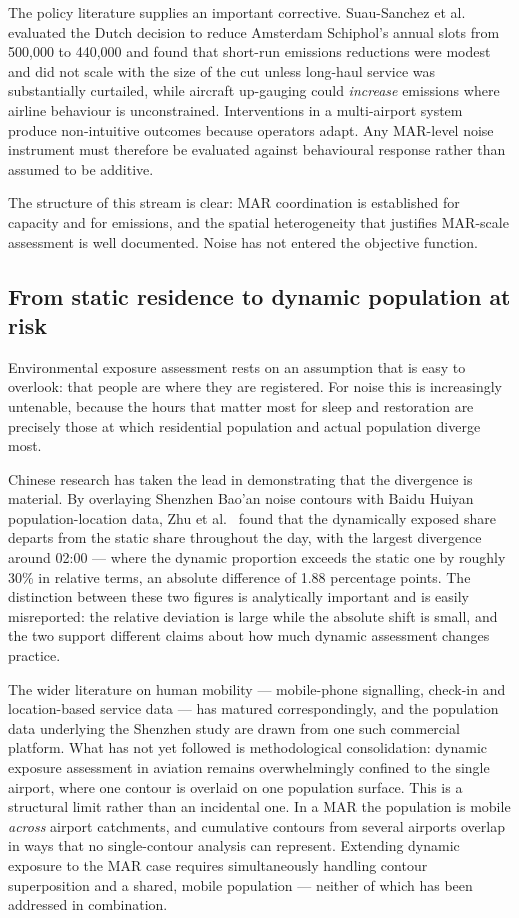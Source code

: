 \documentclass[review,12pt]{elsarticle}
\begin{document}
The policy literature supplies an important corrective. Suau-Sanchez et
al.~\cite{suau2025does} evaluated the Dutch decision to reduce Amsterdam
Schiphol's annual slots from 500,000 to 440,000 and found that short-run
emissions reductions were modest and did not scale with the size of the cut
unless long-haul service was substantially curtailed, while aircraft
up-gauging could \emph{increase} emissions where airline behaviour is
unconstrained. Interventions in a multi-airport system produce non-intuitive
outcomes because operators adapt. Any MAR-level noise instrument must therefore
be evaluated against behavioural response rather than assumed to be additive.

The structure of this stream is clear: MAR coordination is established for
capacity and for emissions, and the spatial heterogeneity that justifies
MAR-scale assessment is well documented. Noise has not entered the objective
function.

\subsection{From static residence to dynamic population at risk}
\label{sec:lr-dynamic}

Environmental exposure assessment rests on an assumption that is easy to
overlook: that people are where they are registered. For noise this is
increasingly untenable, because the hours that matter most for sleep and
restoration are precisely those at which residential population and actual
population diverge most.

Chinese research has taken the lead in demonstrating that the divergence is
material. By overlaying Shenzhen Bao'an noise contours with Baidu Huiyan
population-location data, Zhu et al.~\cite{zhu2025dynamic} found that the
dynamically exposed share departs from the static share throughout the day, with
the largest divergence around 02:00 --- where the dynamic proportion exceeds the
static one by roughly 30\% in relative terms, an absolute difference of 1.88
percentage points. The distinction between these two figures is analytically
important and is easily misreported: the relative deviation is large while the
absolute shift is small, and the two support different claims about how much
dynamic assessment changes practice.

The wider literature on human mobility --- mobile-phone signalling, check-in and
location-based service data --- has matured correspondingly, and the population
data underlying the Shenzhen study are drawn from one such commercial platform.
What has not yet followed is methodological consolidation: dynamic exposure
assessment in aviation remains overwhelmingly
confined to the single airport, where one contour is overlaid on one population
surface. This is a structural limit rather than an incidental one. In a MAR the
population is mobile \emph{across} airport catchments, and cumulative contours
from several airports overlap in ways that no single-contour analysis can
represent. Extending dynamic exposure to the MAR case requires simultaneously
handling contour superposition and a shared, mobile population --- neither of
which has been addressed in combination.
\end{document}
